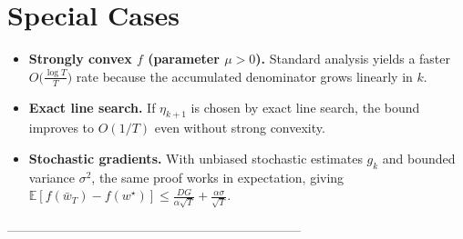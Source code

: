 \documentclass{article}
\begin{document}
\section*{Special Cases}
\begin{itemize}
\item \textbf{Strongly convex $f$ (parameter $\mu>0$).}
   Standard analysis yields a faster $O\!\bigl(\frac{\log T}{T}\bigr)$ rate
   because the accumulated denominator grows linearly in $k$.
\item \textbf{Exact line search.}
   If $\eta_{k+1}$ is chosen by exact line search, the bound improves to
   $O(1/T)$ even without strong convexity.
\item \textbf{Stochastic gradients.}
   With unbiased stochastic estimates $g_k$ and bounded variance $\sigma^2$,
   the same proof works in expectation, giving
   $\mathbb{E}[f(\bar w_T)-f(w^\star)]\le
   \frac{D G}{\alpha\sqrt{T}}+ \frac{\alpha\sigma}{\sqrt{T}}$.
\end{itemize}

---------------------------------------------------------------------
\end{document}
